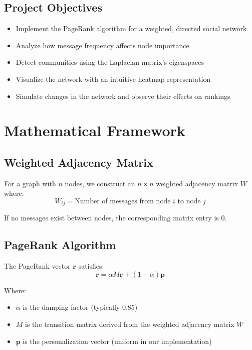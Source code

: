 \documentclass[12pt,letterpaper]{article}
\begin{document}
\subsection{Project Objectives}
\begin{itemize}
    \item Implement the PageRank algorithm for a weighted, directed social network
    \item Analyze how message frequency affects node importance
    \item Detect communities using the Laplacian matrix's eigenspaces
    \item Visualize the network with an intuitive heatmap representation
    \item Simulate changes in the network and observe their effects on rankings
\end{itemize}

\section{Mathematical Framework}
\subsection{Weighted Adjacency Matrix}
For a graph with $n$ nodes, we construct an $n \times n$ weighted adjacency matrix $W$ where:
\begin{equation}
    W_{ij} = \text{Number of messages from node $i$ to node $j$}
\end{equation}

If no messages exist between nodes, the corresponding matrix entry is 0.

\subsection{PageRank Algorithm}
The PageRank vector $\mathbf{r}$ satisfies:
\begin{equation}
    \mathbf{r} = \alpha M\mathbf{r} + (1-\alpha)\mathbf{p}
\end{equation}

Where:
\begin{itemize}
    \item $\alpha$ is the damping factor (typically 0.85)
    \item $M$ is the transition matrix derived from the weighted adjacency matrix $W$
    \item $\mathbf{p}$ is the personalization vector (uniform in our implementation)
\end{itemize}
\end{document}
